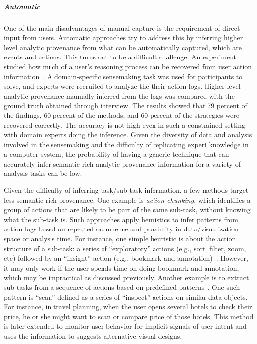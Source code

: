 \subparagraph{Automatic}
One of the main disadvantages of manual capture is the requirement of direct input from users. Automatic approaches try to address this by inferring higher level analytic provenance from what can be automatically captured, which are events and actions. This turns out to be a difficult challenge. An experiment studied how much of a user's reasoning process can be recovered from user action information~\cite{Dou2009}. A domain-specific sensemaking task was used for participants to solve, and experts were recruited to analyze the their action logs. Higher-level analytic provenance manually inferred from the logs was compared with the ground truth obtained through interview. The results showed that 79 percent of the findings, 60 percent of the methods, and 60 percent of the strategies were recovered correctly. The accuracy is not high even in such a constrained setting with domain experts doing the inference. Given the diversity of data and analysis involved in the sensemaking and the difficulty of replicating expert knowledge in a computer system, the probability of having a generic technique that can accurately infer semantic-rich analytic provenance information for a variety of analysis tasks can be low.


Given the difficulty of inferring task/sub-task information, a few methods target less semantic-rich provenance. One example is \emph{action chunking}, which identifies a group of actions that are likely to be part of the same sub-task, without knowing what the sub-task is. Such approaches apply heuristics to infer patterns from action logs based on repeated occurrence and proximity in data/visualization space or analysis time. For instance, one simple heuristic is about the action structure of a sub-task: a series of ``exploratory'' actions (e.g., sort, filter, zoom, etc) followed by an ``insight'' action (e.g., bookmark and annotation)~\cite{Gotz2009}. However, it may only work if the user spends time on doing bookmark and annotation, which may be impractical as discussed previously. Another example is to extract sub-tasks from a sequence of actions based on predefined patterns~\cite{Gotz2009b}. One such pattern is ``scan'' defined as a series of ``inspect'' actions on similar data objects. For instance, in travel planning, when the user opens several hotels to check their price, he or she might want to scan or compare price of those hotels. This method is later extended to monitor user behavior for implicit signals of user intent and uses the information to suggests alternative visual designs.

